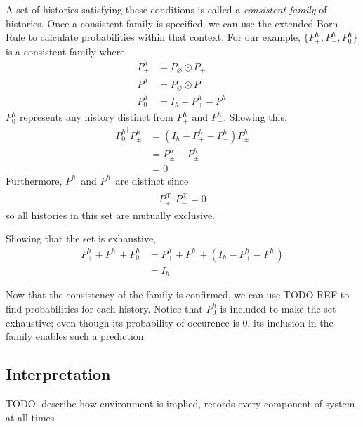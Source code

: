 A set of histories satisfying these conditions is called a \textit{consistent family} of histories. Once a consistent family is specified, we can use the extended Born Rule to calculate probabilities within that context. For our example, $\{P^h_+, P^h_-, P^h_0\}$ is a consistent family where
\begin{align}
    P^h_+ &= P_\varnothing \odot P_+ \\ \nonumber
    P^h_- &= P_\varnothing \odot P_- \\ \nonumber
    P^h_0 &= I_h - P^h_+ - P^h_-
\end{align}
$P^h_0$ represents any history distinct from $P^h_+$ and $P^h_-$. Showing this,
\begin{align}
  {P^h_0}^\dagger P^h_\pm &= (I_h - P^h_+ - P^h_-) P^h_\pm \\ \nonumber
  &= P^h_\pm - P^h_\pm \\ \nonumber
  &= 0
\end{align}
Furthermore, $P^h_+$ and $P^h_-$ are distinct since
\begin{align}
  {P^\mathcal{X}_+}^\dagger P^\mathcal{X}_- = 0
\end{align}
so all histories in this set are mutually exclusive.

Showing that the set is exhaustive,
\begin{align}
  P^h_+ + P^h_- + P^h_0 &=  P^h_+ + P^h_- + \left(I_h - P^h_+ - P^h_- \right) \\ \nonumber
  &= I_h
\end{align}

Now that the consistency of the family is confirmed, we can use TODO REF to find probabilities for each history. Notice that $P^h_0$ is included to make the set exhaustive; even though its probability of occurence is $0$, its inclusion in the family enables such a prediction.

\subsection{Interpretation}

TODO: describe how environment is implied, records every component of system at all times
